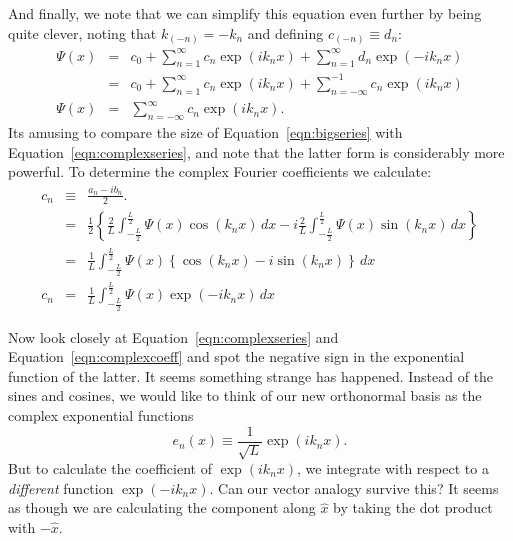 \documentclass[12pt]{article}
\begin{document}
And finally, we note that we can simplify this equation even further by being quite clever, noting that 
$k_{(-n)} = -k_n$ and defining $c_{(-n)} \equiv d_n$:
\begin{eqnarray}
\Psi(x)  &=& c_0 + \sum_{n=1}^{\infty}  c_n \exp(i k_n x) + \sum_{n=1}^{\infty}  d_n \exp(-i k_n x) \nonumber \\
 &=& c_0 + \sum_{n=1}^{\infty}  c_n \exp(i k_n x) + \sum_{n=-\infty}^{-1}  c_n \exp(i k_n x) \nonumber \\
\Psi(x) &=& \sum_{n=-\infty}^{\infty} c_n \exp(i k_n x). \label{eqn:complexseries}
\end{eqnarray}
Its amusing to compare the size of Equation~\ref{eqn:bigseries} with Equation~\ref{eqn:complexseries}, and note that the latter form is considerably more powerful.  To determine the complex Fourier coefficients we calculate:
\begin{eqnarray}
c_n &\equiv& \frac{a_n - i b_n}{2}. \nonumber \\
&=& \frac{1}{2} \left\{ 
\frac{2}{L} \int_{-\frac{L}{2}}^{\frac{L}{2}}  \Psi(x) \cos( k_n x) \, dx
-i \frac{2}{L} \int_{-\frac{L}{2}}^{\frac{L}{2}}  \Psi(x) \sin( k_n x) \, dx
\right\} \nonumber \\
&=& \frac{1}{L} \int_{-\frac{L}{2}}^{\frac{L}{2}}  \Psi(x) \left\{\cos( k_n x) - i \sin( k_n x) \right\} \, dx \nonumber \\
c_n &=& \frac{1}{L} \int_{-\frac{L}{2}}^{\frac{L}{2}}  \Psi(x) \exp(-i k_n x) \, dx \label{eqn:complexcoeff}
\end{eqnarray}

Now look closely at Equation~\ref{eqn:complexseries} and Equation~\ref{eqn:complexcoeff} and spot the negative sign in the exponential function of the latter.  It seems something strange has happened.  Instead of the sines and cosines, we would like to think of our new orthonormal basis as the complex exponential functions 
\begin{equation}
e_n(x) \equiv \frac{1}{\sqrt{L}}\exp(i k_n x).  
\end{equation}
But to calculate the coefficient of $\exp(i k_n x)$, we integrate with respect to a {\em different} function $\exp(-i k_n x)$.  Can our vector analogy survive this?  It seems as though we are calculating the component along $\hat{x}$ by taking the dot product with $-\hat{x}$.   
\end{document}
